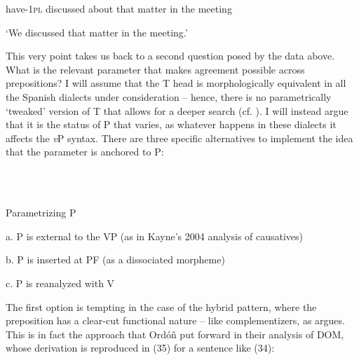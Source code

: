 \documentclass[output=paper]{langsci/langscibook}
\begin{document}
\begin{styleHTMLPreformatted}
        have{}-\textsc{1pl}  discussed  about  that  matter  in  the meeting
\end{styleHTMLPreformatted}

\begin{styleHTMLPreformatted}
        ‘We discussed that matter in the meeting.’
\end{styleHTMLPreformatted}

\begin{styleHTMLPreformatted}
This very point takes us back to a second question posed by the data above. What is the relevant parameter that makes agreement possible across prepositions? I will assume that the T head is morphologically equivalent in all the Spanish dialects under consideration – hence, there is no parametrically ‘tweaked’ version of T that allows for a deeper search (cf. \citealt{Chomsky2001}). I will instead argue that it is the status of P that varies, as whatever happens in these dialects it affects the \textit{v}P syntax. There are three specific alternatives to implement the idea that the parameter is anchored to P:
\end{styleHTMLPreformatted}

\begin{styleHTMLPreformatted}
\ea%
    \label{ex:key:33}
    \gll\\
        \\
    \glt
    \z

          Parametrizing P
\end{styleHTMLPreformatted}

\begin{styleHTMLPreformatted}
  a.   P is external to the VP (as in Kayne’s 2004 analysis of causatives)
\end{styleHTMLPreformatted}

\begin{styleHTMLPreformatted}
  b.   P is inserted at PF (as a dissociated morpheme)
\end{styleHTMLPreformatted}

\begin{styleHTMLPreformatted}
  c.   P is reanalyzed with V
\end{styleHTMLPreformatted}

\begin{styleHTMLPreformatted}
The first option is tempting in the case of the hybrid pattern, where the preposition has a clear-cut functional nature – like complementizers, as \citet{Kayne2004} argues. This is in fact the approach that Ordóñ\citet{ez2017} put forward in their analysis of DOM, whose derivation is reproduced in (35) for a sentence like (34):
\end{styleHTMLPreformatted}
\end{document}
